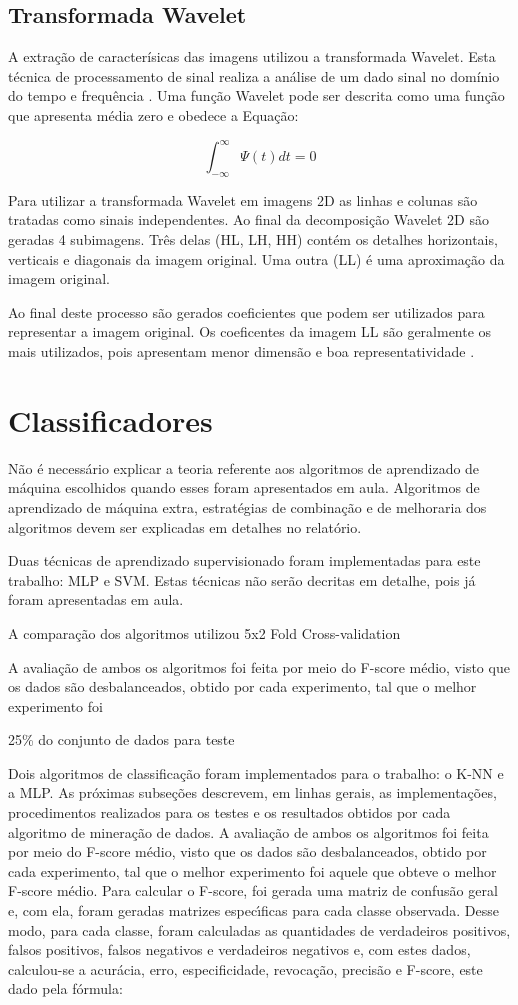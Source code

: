 \documentclass[conference]{IEEEtran}
\begin{document}
\subsection{Transformada Wavelet}
A extração de caracterísicas das imagens utilizou a transformada Wavelet. Esta técnica de processamento de sinal realiza a análise de um dado sinal no domínio do tempo e frequência \cite{costa2011ensemble}. Uma função Wavelet pode ser descrita como uma função que apresenta média zero e obedece a Equação:

\[\int_{-\infty}^{\infty} \Psi(t)dt = 0\]

Para utilizar a transformada Wavelet em imagens 2D as linhas e colunas são tratadas como sinais independentes. Ao final da decomposição Wavelet 2D são geradas 4 subimagens. Três delas (HL, LH, HH) contém os detalhes horizontais, verticais e diagonais da imagem original. Uma outra (LL) é uma aproximação da imagem original.

Ao final deste processo são gerados coeficientes que podem ser utilizados para representar a imagem original. Os coeficentes da imagem LL são geralmente os mais utilizados, pois apresentam menor dimensão e boa representatividade \cite{burrus1997introduction}.

\section{Classificadores}
Não é necessário explicar a teoria referente aos algoritmos de aprendizado de máquina
escolhidos quando esses foram apresentados em aula. Algoritmos de aprendizado de máquina
extra, estratégias de combinação e de melhoraria dos algoritmos devem ser explicadas em
detalhes no relatório.

Duas técnicas de aprendizado supervisionado foram implementadas para este trabalho: MLP e SVM. Estas técnicas não serão decritas em detalhe, pois já foram apresentadas em aula.

A comparação dos algoritmos utilizou 5x2 Fold Cross-validation

 A avaliação de ambos os algoritmos foi feita por meio do
F-score médio, visto que os dados são desbalanceados, obtido
por cada experimento, tal que o melhor experimento foi

25\% do conjunto de dados para teste


Dois algoritmos de classificação foram implementados
para o trabalho: o K-NN e a MLP. As próximas
subseções descrevem, em linhas gerais, as implementações,
procedimentos realizados para os testes e os resultados
obtidos por cada algoritmo de mineração de dados.
A avaliação de ambos os algoritmos foi feita por meio do
F-score médio, visto que os dados são desbalanceados, obtido
por cada experimento, tal que o melhor experimento foi
aquele que obteve o melhor F-score médio.
Para calcular o F-score, foi gerada uma matriz de confusão
geral e, com ela, foram geradas matrizes especı́ficas para
cada classe observada. Desse modo, para cada classe, foram
calculadas as quantidades de verdadeiros positivos, falsos
positivos, falsos negativos e verdadeiros negativos e, com
estes dados, calculou-se a acurácia, erro, especificidade,
revocação, precisão e F-score, este dado pela fórmula:
\end{document}
